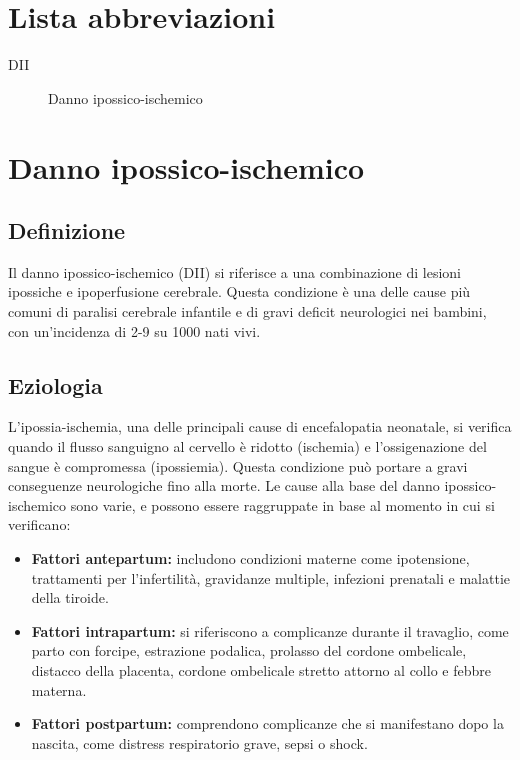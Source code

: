 \section*{Lista abbreviazioni}
\begin{description}
	\item[DII] Danno ipossico-ischemico
\end{description}

\section{Danno ipossico-ischemico}

\subsection{Definizione}
Il danno ipossico-ischemico (DII) si riferisce a una combinazione di lesioni ipossiche e ipoperfusione cerebrale. Questa condizione è una delle cause più comuni di paralisi cerebrale infantile e di gravi deficit neurologici nei bambini, con un'incidenza di 2-9 su 1000 nati vivi.

\subsection{Eziologia}
L'ipossia-ischemia, una delle principali cause di encefalopatia neonatale, si verifica quando il flusso sanguigno al cervello è ridotto (ischemia) e l'ossigenazione del sangue è compromessa (ipossiemia). Questa condizione può portare a gravi conseguenze neurologiche fino alla morte.
Le cause alla base del danno ipossico-ischemico sono varie, e possono essere raggruppate in base al momento in cui si verificano:

\begin{itemize}
	\tightlist
	\item
	\textbf{Fattori antepartum:} includono condizioni materne come ipotensione, trattamenti per l'infertilità, gravidanze multiple, infezioni prenatali e malattie della tiroide.
	\item
	\textbf{Fattori intrapartum:} si riferiscono a complicanze durante il travaglio, come parto con forcipe, estrazione podalica, prolasso del cordone ombelicale, distacco della placenta, cordone ombelicale stretto attorno al collo e febbre materna.
	\item
	\textbf{Fattori postpartum:} comprendono complicanze che si manifestano dopo la nascita, come distress respiratorio grave, sepsi o shock.
\end{itemize}

